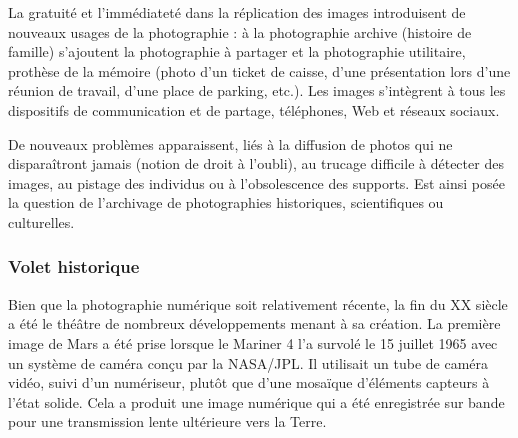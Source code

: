 \begin{tcolorbox}[title={Impacts sur les pratiques humaines}, toprule=0pt, leftrule=0pt, rightrule=0pt, arc=0pt,
                  fonttitle=\scshape\boxtitlefont,
                  colbacktitle=white, coltitle=firstcolor, colframe=firstcolor, colback=firstcolor!10,
                  breakable, enhanced jigsaw]
La gratuité et l’immédiateté dans la réplication des images introduisent de nouveaux usages de la photographie : à la photographie archive (histoire de famille) s’ajoutent la photographie à partager et la photographie utilitaire, prothèse de la mémoire (photo d’un ticket de caisse, d’une présentation lors d’une réunion de travail, d’une place de parking, etc.). Les images s’intègrent à tous les dispositifs de communication et de partage, téléphones, Web et réseaux sociaux.

De nouveaux problèmes apparaissent, liés à la diffusion de photos qui ne disparaîtront jamais (notion de droit à l’oubli), au trucage difficile à détecter des images, au pistage des individus ou à l’obsolescence des supports. Est ainsi posée la question de l’archivage de photographies historiques, scientifiques ou culturelles.
\end{tcolorbox}

\subsubsection[Volet historique]{Volet historique}
\label{subsub:VIII.2.1.2}

Bien que la photographie numérique soit relativement récente, la fin du XX siècle a été le théâtre de nombreux développements menant à sa création. La première image de Mars a été prise lorsque le Mariner 4 l'a survolé le 15 juillet 1965 avec un système de caméra conçu par la NASA/JPL. Il utilisait un tube de caméra vidéo, suivi d'un numériseur, plutôt que d'une mosaïque d'éléments capteurs à l'état solide. Cela a produit une image numérique qui a été enregistrée sur bande pour une transmission lente ultérieure vers la Terre.

